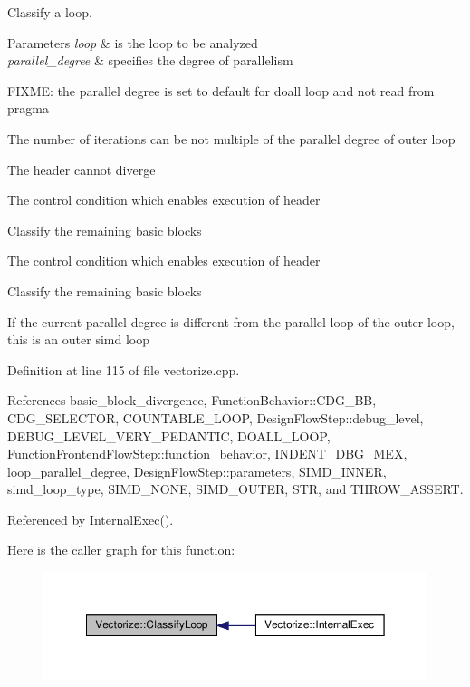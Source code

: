 Classify a loop. 


\begin{DoxyParams}{Parameters}
{\em loop} & is the loop to be analyzed \\
\hline
{\em parallel\+\_\+degree} & specifies the degree of parallelism \\
\hline
\end{DoxyParams}
F\+I\+X\+ME\+: the parallel degree is set to default for doall loop and not read from pragma

The number of iterations can be not multiple of the parallel degree of outer loop

The header cannot diverge

The control condition which enables execution of header

Classify the remaining basic blocks

The control condition which enables execution of header

Classify the remaining basic blocks

If the current parallel degree is different from the parallel loop of the outer loop, this is an outer simd loop 

Definition at line 115 of file vectorize.\+cpp.



References basic\+\_\+block\+\_\+divergence, Function\+Behavior\+::\+C\+D\+G\+\_\+\+BB, C\+D\+G\+\_\+\+S\+E\+L\+E\+C\+T\+OR, C\+O\+U\+N\+T\+A\+B\+L\+E\+\_\+\+L\+O\+OP, Design\+Flow\+Step\+::debug\+\_\+level, D\+E\+B\+U\+G\+\_\+\+L\+E\+V\+E\+L\+\_\+\+V\+E\+R\+Y\+\_\+\+P\+E\+D\+A\+N\+T\+IC, D\+O\+A\+L\+L\+\_\+\+L\+O\+OP, Function\+Frontend\+Flow\+Step\+::function\+\_\+behavior, I\+N\+D\+E\+N\+T\+\_\+\+D\+B\+G\+\_\+\+M\+EX, loop\+\_\+parallel\+\_\+degree, Design\+Flow\+Step\+::parameters, S\+I\+M\+D\+\_\+\+I\+N\+N\+ER, simd\+\_\+loop\+\_\+type, S\+I\+M\+D\+\_\+\+N\+O\+NE, S\+I\+M\+D\+\_\+\+O\+U\+T\+ER, S\+TR, and T\+H\+R\+O\+W\+\_\+\+A\+S\+S\+E\+RT.



Referenced by Internal\+Exec().

Here is the caller graph for this function\+:
\nopagebreak
\begin{figure}[H]
\begin{center}
\leavevmode
\includegraphics[width=350pt]{d5/da5/classVectorize_a0043972f172aca39c296d6a3a4559015_icgraph}
\end{center}
\end{figure}
\mbox{\label{classVectorize_acc3c1a7baaaf386b05c44ec4c8d6f3ce}} 
